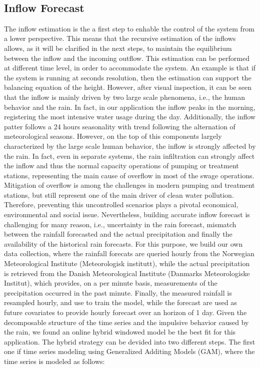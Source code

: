 \


\subsection{Inflow Forecast}
The inflow estimation is the a first step to enhable the control of the system from a lower
perspective. This means that the recursive estimation of the inflows allows, as it will be clarified in the next 
steps, to maintain the equilibrium between the inflow and the incoming outflow. This estimation can be performed 
at different time level, in order to accommodate the system. An example is that if the system is running at 
seconds resolution, then the estimation can support the balancing equation of the height. However, after visual 
inspection, it can be seen that the inflow is mainly driven by two large scale phenomena, i.e., the human 
behavior and the rain. In fact, in our application the inflow peaks in the morning, registering the 
most intensive water usage during the day. Additionally, the inflow patter follows a 24 hours seasonality with trend 
following the alternation of meteorological seasons. However, on the top of this components largely characterized by the 
large scale human behavior, the inflow is strongly affected by the rain. In fact, even in separate systems, the rain 
infiltration can strongly affect the inflow and thus the normal capacity operations of pumping or treatment stations, representing the main cause of 
overflow in most of the swage operations. Mitigation of overflow is among the challenges in modern pumping and treatment stations, but still represent 
one of the main driver of clean water pollution. Therefore, preventing this uncontrolled scenarios plays a pivotal economical, environmental and social issue. 
Nevertheless, building accurate inflow forecast is challenging for many reason, i.e., uncertainty in the rain forecast, mismatch between the 
rainfall forecasted and the actual precipitation and finally the availability of the historical rain forecasts. 
For this purpose, we build our own data collection, where the rainfall forecats are queried hourly from the Norwegian Meteorological Institute (Meteorologisk institutt), while the 
actual precipitation is retrieved from the Danish Meteorological Institute (Danmarks Meteorologiske Institut), which provides, on a per minute basis,  measurements of 
the precipitation occurred in the past minute. Finally, the measured rainfall is resampled hourly, and use to train the model, while the forecast 
are used as future covariates to provide hourly forecast over an horizon of 1 day.
Given the decomposable structure of the time series and the impulsive behavior caused by the rain, we found
an online hybrid windowed model be the best fit for this application. The hybrid strategy can be devided into
two different steps. The first one if time series modeling using Generalized Additing Models (GAM), where the time 
series is modeled as follows: 

